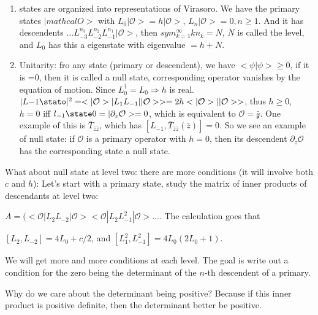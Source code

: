 \documentclass[12pt]{article}%
\theoremstyle{definition}
\theoremstyle{remark}
\theoremstyle{definition}
\theoremstyle{definition}
\newcommand{\stateo}{|\mathcal{O}>}
\begin{document}
    \begin{enumerate}
        \item states are organized into representations of Virasoro. We have the primary states $|mathcal{O}>$ with $L_0 \stateo = h \stateo$, $L_n \stateo = 0 , n \geq 1$. And it has descendents $\ldots L_{-3}^{n_3} L_{-2}^{n_2}L_{-1}^{n_1} \stateo$, then $sym_{k=1}^{\infty}kn_k = N$, $N$ is called the level, and $L_0$ has this a eigenstate with eigenvalue $=h+N$.
        \item  Unitarity: fro any state (primary or descendent), we have $<\psi| \psi> \geq 0$, if it is =0, then it is called a null state, corresponding operator vanishes by the equation of motion.
        Since $L^\dagger_0 = L_0 \Rightarrow h$ is real.
        $|L{-1}\stato|^2 = <\stateo| L_1 L_{-1} |\stateo> =  2h<\stateo|\stateo>$, thus $h \geq 0$, $h = 0$ iff $l_{-1}\state0 = |\partial_z \mathcal{O}> = 0$, which is equivalent to $\mathcal{O} = \mathcal{\bar{z}}.$ One example of this is $\bar{T}_{\bar{z} \bar{z}}$, which has $[L_{-1},  \bar{T}_{\bar{z} \bar{z}}(\bar{z})] = 0$. So we see an example of null state: if $\mathcal{O}$ is a primary operator with $h = 0$, then its descendent $\partial_z \mathcal{O}$ has the corresponding state a null state.


    \end{enumerate}

    What about null state at level two: there are more conditions (it will involve both $c$ and $h$):
    Let's start with a primary state, study the matrix of inner products of descendants at level two:


    $A = (<\mathcal{O}| L_2 L_{-2} | \mathcal{O}> <\mathcal{O}|L_2 L^2_{-1}| \mathcal{O}>...$. The calculation goes that


    $[L_2, L_{-2}] = 4 L_0 + c/2$, and $[L^2_1, L^2_{-1}] = 4L_0(2 L_0 +1)$.

    We will get more and more conditions at each level. The goal is write out a condition for the zero being the determinant of the $n$-th descendent of a primary.

    Why do we care about the determinant being positive? Because if this inner product is positive definite, then the determinant better be positive.

    \listoftodos
\end{document}
